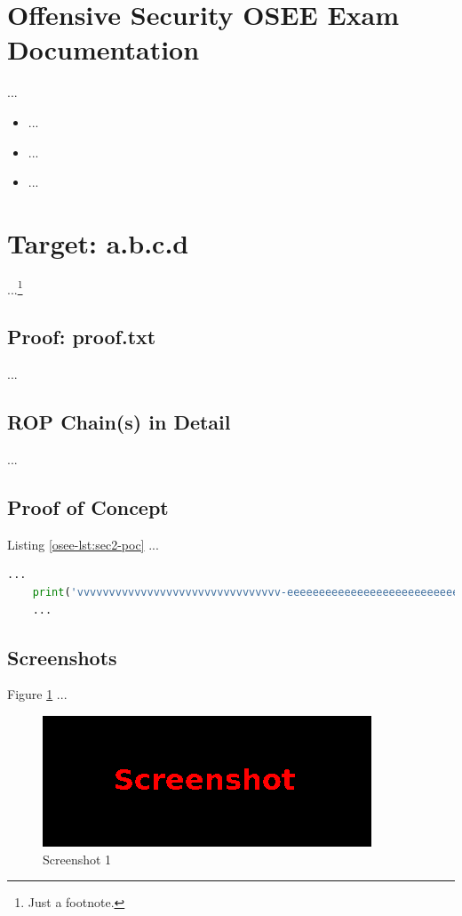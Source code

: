 %
%
%
\section{Offensive Security OSEE Exam Documentation}\label{osee-sec:sec1}
%
...

\begin{itemize}
    \item ...
    \item ...
    \item ...
\end{itemize}
%
%
%
\section{Target: a.b.c.d}\label{osee-sec:sec2}
%
...\footnote{Just a footnote.}
%
%
%
\subsection{Proof: proof.txt}\label{osee-sec:sec2-proof}
%
...
%
%
%
\subsection{ROP Chain(s) in Detail}\label{osee-sec:sec2-rop}
%
...
%
%
%
\subsection{Proof of Concept}\label{osee-sec:sec2-poc}
%
Listing \ref{osee-lst:sec2-poc} ...\\

\begin{lstlisting}[language=Python,caption={Proof of Concept}, label={osee-lst:sec2-poc}]
    ...
    print('vvvvvvvvvvvvvvvvvvvvvvvvvvvvvvvv-eeeeeeeeeeeeeeeeeeeeeeeeeeeeeeeeeeeeeeeeeee-looooooooooooooooooooooong-striiiiiiiiiiiiiing')
    ...
\end{lstlisting}
%
%
%
\subsection{Screenshots}\label{osee-sec:sec2-screens}
%
Figure \ref{osee-fig:sec2-screen1} ...

\begin{figure}[H]
    \centering
    \includegraphics[width=\textwidth]{img/assignment1/screen1.png}
    \caption{Screenshot 1}\label{osee-fig:sec2-screen1}
\end{figure}
%
%
%
